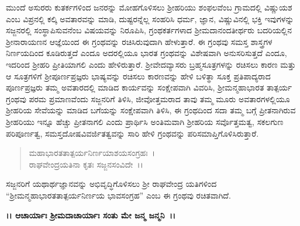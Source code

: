 ಮುಂದೆ ಅಸುರರು ಕುತರ್ಕಗಳಿಂದ ಜನರನ್ನು ಮೋಹಗೊಳಿಸಲು ಶ‍್ರೀಹರಿಯು ಶಂಫಲವೆಂಬ ಗ್ರಾಮದಲ್ಲಿ ವಿಷ್ಣುಯಶ ಎಂಬ ವಿಪ್ರನಲ್ಲಿ ಕಲ್ಕಿ ಅವತಾರವನ್ನು ಮಾಡಿ, ದುಷ್ಟರನ್ನೆಲ್ಲ ಸಂಹರಿಸಿ ಧರ್ಮ, ಜ್ಞಾನ, ವಿಷ್ಣುವಿನಲ್ಲಿ ಭಕ್ತಿ ಇವುಗಳನ್ನು ಸಜ್ಜನರಲ್ಲಿ ಸಂಸ್ಥಾಪಿ\-ಸುವನೆಂಬ ವಿಷಯವನ್ನು ನಿರೂಪಿಸಿ, ಗ್ರಂಥಕರ್ತಗಳಾದ ಶ‍್ರೀಮದಾನಂದತೀರ್ಥರು ಬದರಿಯಲ್ಲಿನ ಶ‍್ರೀನಾರಾಯಣನ ಆಜ್ಞೆಯಿಂದ ಈ ಗ್ರಂಥವನ್ನು ರಚಿಸಿರುವುದಾಗಿ ಹೇಳುತ್ತಾರೆ. ಈ ಗ್ರಂಥವು ಸಮಸ್ತ ಶಾಸ್ತ್ರಗಳ ನಿರ್ಣಯದಿಂದ ಕೂಡಿರುತ್ತದೆ ಎಂದೂ ಅದರಲ್ಲಿಯೂ ಭಾರತ ಗ್ರಂಥವನ್ನು ವಿಶೇಷವಾಗಿ ಅನುಸರಿಸುತ್ತದೆ ಎಂದೂ, ಇದರಿಂದ ಶ‍್ರೀಹರಿ ಪ್ರೀತಿಯಾಗಲಿ ಎಂದು ಹೇಳಿರುತ್ತಾರೆ. ಶ‍್ರೀವೇದವ್ಯಾಸರು ಬ್ರಹ್ಮಸೂತ್ರಗಳನ್ನು ರಚಿಸಲು ಕಾರಣ ಮತ್ತು ಆ ಸೂತ್ರಗಳಿಗೆ ಶ‍್ರೀಪೂರ್ಣಪ್ರಜ್ಞರು ಭಾಷ್ಯವನ್ನು ರಚಿಸಲು ಕಾರಣವನ್ನು ಹೇಳಿ ಬಳಿತ್ಥಾ ಸೂಕ್ತ ಪ್ರತಿಪಾದ್ಯರಾದ ಪೂರ್ಣಪ್ರಜ್ಞರು ತಮ್ಮ ಅವತಾರದಲ್ಲಿ ಮಾಡಿದ ಕಾರ್ಯವನ್ನು ಸಂಕ್ಷೇಪವಾಗಿ ವಿವರಿಸಿ, ಶ‍್ರೀಮನ್ಮಹಾಭಾರತ ತಾತ್ಪರ್ಯ ಗ್ರಂಥವು ಪರಮ ಪ್ರಮಾಣವೆಂದು ಸಜ್ಜನರಿಗೆ ತಿಳಿಸಿ, ಜೀವೋತ್ತಮರಾದ ತಾವು ತಮ್ಮ ಮೂರು ಅವತಾರಗಳಲ್ಲಿಯೂ ಶ‍್ರೀಹರಿಯ ಸೇವೆಯನ್ನು ಮಾಡಿದ ಬಗೆಯನ್ನು ಸಂಕ್ಷೇಪವಾಗಿ ತಿಳಿಸಿ, ಈ ಗ್ರಂಥದಿಂದ ಸದಾ ತಮ್ಮ ಬಗ್ಗೆ ಪ್ರೀತನಾಗಿರುವ ಶ‍್ರೀಹರಿಯು ಇನ್ನೂ ಹೆಚ್ಚು ಪ್ರೀತನಾಗಲಿ ಎಂದು ಪ್ರಾರ್ಥಿಸಿ ಅಂತಿಮವಾಗಿ ಶ‍್ರೀಹರಿಯ ಸರ್ವೊತ್ತಮತ್ವ, ಸಕಲಗುಣ ಪರಿಪೂರ್ಣತ್ವ, ಸಮಸ್ತದೋಷವಿವರ್ಜಿತತ್ವವನ್ನು ಸಾರಿ ಹೇಳಿ ಗ್ರಂಥವನ್ನು ಪರಿಸಮಾಪ್ತಿಗೊಳಿಸಿರುತ್ತಾರೆ.

\begin{verse}
ಮಹಾಭಾರತತಾತ್ಪರ್ಯನಿರ್ಣಯಾಶಯಸಂಗ್ರಹಃ~।\\ ರಾಘವೇಂದ್ರಯತಿನಾ ಕೃತಃ ಸಜ್ಜನಸಂವಿದೇ~।।
\end{verse}

ಸಜ್ಜನರಿಗೆ ಯಥಾರ್ಥಜ್ಞಾನವನ್ನು ಅಭಿವೃದ್ಧಿಗೊಳಿಸಲು ಶ‍್ರೀ ರಾಘವೇಂದ್ರ ಯತಿಗಳಿಂದ “ಶ‍್ರೀಮನ್ಮಹಾಭಾರತತಾತ್ಪರ್ಯನಿರ್ಣಯ ಭಾವಸಂಗ್ರಹ” ಎಂಬ ಈ ಗ್ರಂಥವು ರಚಿತವಾಗಿದೆ.

\begin{center}
\textbf{।। ಆಚಾರ್ಯಾಃ ಶ‍್ರೀಮದಾಚಾರ್ಯಾಃ ಸಂತು ಮೇ ಜನ್ಮ ಜನ್ಮನಿ~।।}
\end{center}

